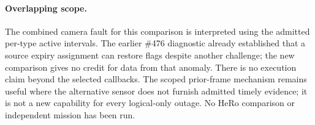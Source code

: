 \documentclass{article}
\begin{document}
\paragraph{Overlapping scope.}
The combined camera fault for this comparison is interpreted
using the admitted per-type active intervals. The earlier
\#476 diagnostic already established that a source expiry
assignment can restore flags despite another challenge; the
new comparison gives no credit for data from that anomaly.
There is no execution claim beyond the selected callbacks.
The scoped prior-frame mechanism remains useful where the
alternative sensor does not furnish admitted timely evidence;
it is not a new capability for every logical-only outage.
No HeRo comparison or independent mission has been run.
\end{document}
